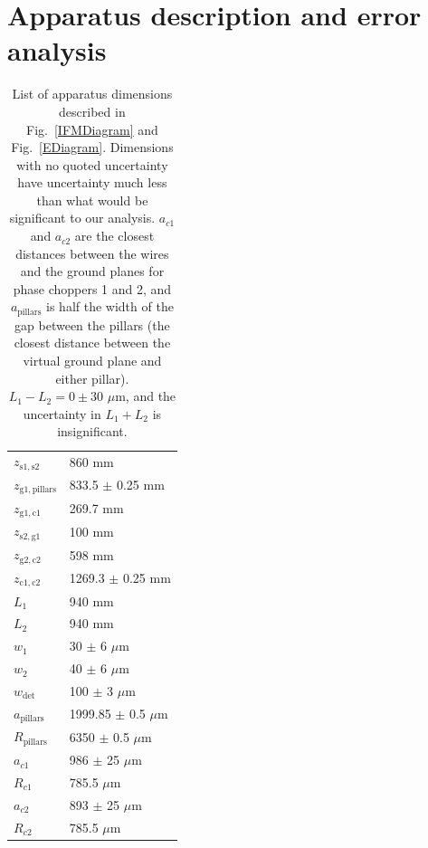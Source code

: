 \documentclass[twocolumn,pra,showpacs,superscriptaddress,longbibliography]{revtex4-1}   %
\newcommand{\figref}[1]{Fig.~\ref{#1}}
\begin{document}


\section{Apparatus description and error analysis} \label{sectionApparatusDescription}

\begingroup
\begin{table}
\caption{\label{tableDimensions}List of apparatus dimensions described in \figref{IFMDiagram} and \figref{EDiagram}. Dimensions with no quoted uncertainty have uncertainty much less than what would be significant to our analysis.
$a_{c1}$ and $a_{c2}$ are the closest distances between the wires and the ground planes for phase choppers 1 and 2, and $a_{\mathrm{pillars}}$ is half the width of the gap between the pillars (the closest distance between the virtual ground plane and either pillar). $L_1-L_2 = 0 \pm 30$ $\mu$m, and the uncertainty in $L_1 + L_2$ is insignificant.}
\begin{center}
\begin{tabular}{l l}
\hline\hline
$z_{\mathrm{s1,s2}}$ & 860 mm \\
$z_{\mathrm{g1,pillars}}$ & 833.5 $\pm$ 0.25 mm \\
$z_{\mathrm{g1,c1}}$ & 269.7 mm \\
$z_{\mathrm{s2,g1}}$ & 100 mm \\
$z_{\mathrm{g2,c2}}$ & 598 mm \\
$z_{\mathrm{c1,c2}}$ & 1269.3 $\pm$ 0.25 mm \\
$L_1$ & 940 mm \\
$L_2$ & 940 mm \\
$w_1$ & 30 $\pm$ 6 $\mu$m \\
$w_2$ & 40 $\pm$ 6 $\mu$m \\
$w_{\mathrm{det}}$ & 100 $\pm$ 3 $\mu$m \\ 
$a_{\mathrm{pillars}}$ & 1999.85 $\pm$ 0.5 $\mu$m \\
$R_{\mathrm{pillars}}$ & 6350 $\pm$ 0.5 $\mu$m \\
$a_{c1}$ & 986 $\pm$ 25 $\mu$m \\
$R_{c1}$ & 785.5 $\mu$m \\
$a_{c2}$ & 893 $\pm$ 25 $\mu$m \\
$R_{c2}$ & 785.5 $\mu$m \\
\hline\hline
\end{tabular}
\end{center}
\end{table}
\endgroup
\end{document}
